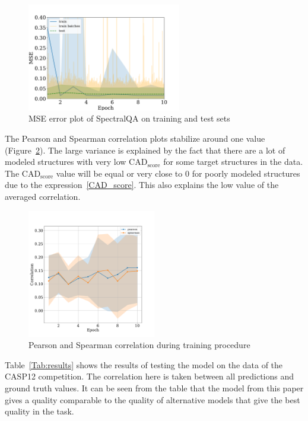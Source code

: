 \documentclass[12pt,twosides]{extarticle}
\begin{document}
\begin{figure}[H]
	\centering
	\includegraphics[width=0.6\textwidth]{training_smallset.pdf}
	\caption{MSE error plot of SpectralQA on training and test sets}
	\label{fig:GCN}
\end{figure}
The Pearson and Spearman correlation plots stabilize around one value (Figure~\ref{fig:correlation}). The large variance is explained by the fact that there are a lot of modeled structures with very low $\text{CAD}_\text{score}$ for some target structures in the data. The $\text{CAD}_\text{score}$ value will be equal or very close to 0 for poorly modeled structures due to the expression~\eqref{CAD_score}. This also explains the low value of the averaged correlation.
\begin{figure}[h]
	\centering
	\includegraphics[width=0.5\textwidth]{training_correlations_smallsettt.pdf}
	\caption{Pearson and Spearman correlation during training procedure}
	\label{fig:correlation}
\end{figure}

Table~\ref{Tab:results} shows the results of testing the model on the data of the CASP12 competition. The correlation here is taken between all predictions and ground truth values. It can be seen from the table that the model from this paper gives a quality comparable to the quality of alternative models that give the best quality in the task.
\end{document}
